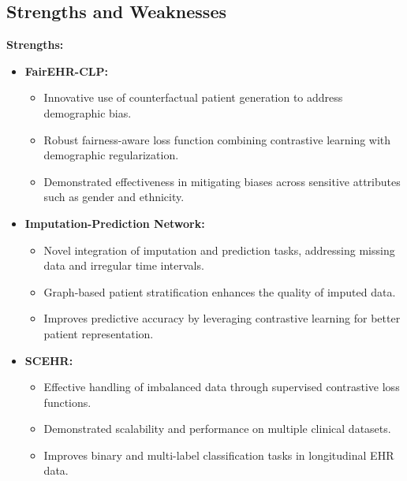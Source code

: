\documentclass[a4paper]{article}
\begin{document}
    \subsection{Strengths and Weaknesses}
    \textbf{Strengths:}
    \begin{itemize}
        \item \textbf{FairEHR-CLP:}
            \begin{itemize}
                \item Innovative use of counterfactual patient generation to address
                    demographic bias.

                \item Robust fairness-aware loss function combining contrastive learning
                    with demographic regularization.

                \item Demonstrated effectiveness in mitigating biases across sensitive
                    attributes such as gender and ethnicity.
            \end{itemize}

        \item \textbf{Imputation-Prediction Network:}
            \begin{itemize}
                \item Novel integration of imputation and prediction tasks,
                    addressing missing data and irregular time intervals.

                \item Graph-based patient stratification enhances the quality of
                    imputed data.

                \item Improves predictive accuracy by leveraging contrastive learning
                    for better patient representation.
            \end{itemize}

        \item \textbf{SCEHR:}
            \begin{itemize}
                \item Effective handling of imbalanced data through supervised contrastive
                    loss functions.

                \item Demonstrated scalability and performance on multiple clinical
                    datasets.

                \item Improves binary and multi-label classification tasks in longitudinal
                    EHR data.
            \end{itemize}
    \end{itemize}
\end{document}
